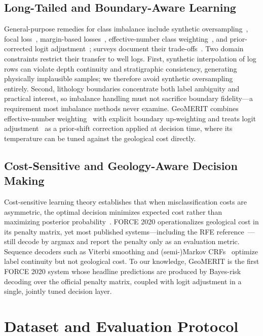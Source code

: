 \documentclass[bdcc,article,submit,pdftex,moreauthors]{Definitions/mdpi}
\begin{document}
\subsection{Long-Tailed and Boundary-Aware Learning}
General-purpose remedies for class imbalance include synthetic
oversampling~\cite{chawla2002smote}, focal loss~\cite{lin2017focal}, margin-based
losses~\cite{cao2019ldam}, effective-number class weighting~\cite{cui2019classbalanced}, and
prior-corrected logit adjustment~\cite{menon2021logit}; surveys document their
trade-offs~\cite{he2024imbalanced}. Two domain constraints restrict their transfer to well
logs. First, synthetic interpolation of log rows can violate depth continuity and
stratigraphic consistency, generating physically implausible samples; we therefore avoid
synthetic oversampling entirely. Second, lithology boundaries concentrate both label
ambiguity and practical interest, so imbalance handling must not sacrifice boundary
fidelity---a requirement most imbalance methods never examine. GeoMERIT combines
effective-number weighting~\cite{cui2019classbalanced} with explicit boundary up-weighting and
treats logit adjustment~\cite{menon2021logit} as a prior-shift correction applied at decision
time, where its temperature can be tuned against the geological cost directly.

\subsection{Cost-Sensitive and Geology-Aware Decision Making}
Cost-sensitive learning theory establishes that when misclassification costs are asymmetric,
the optimal decision minimizes expected cost rather than maximizing posterior
probability~\cite{elkan2001cost,berger1985decision,andrade2019bayes,zadrozny2002multiclass}.
FORCE 2020 operationalizes geological cost in its penalty matrix, yet most published
systems---including the RFE reference~\cite{chen2026rfe}---still decode by argmax and report
the penalty only as an evaluation metric. Sequence decoders such as Viterbi smoothing and
(semi-)Markov CRFs~\cite{viterbi1967,lafferty2001crf,sarawagi2004semimarkov} optimize label
continuity but not geological cost. To our knowledge, GeoMERIT is the first FORCE 2020 system
whose headline predictions are produced by Bayes-risk decoding over the official penalty
matrix, coupled with logit adjustment in a single, jointly tuned decision layer.

\section{Dataset and Evaluation Protocol}
\label{sec:data}
\end{document}

